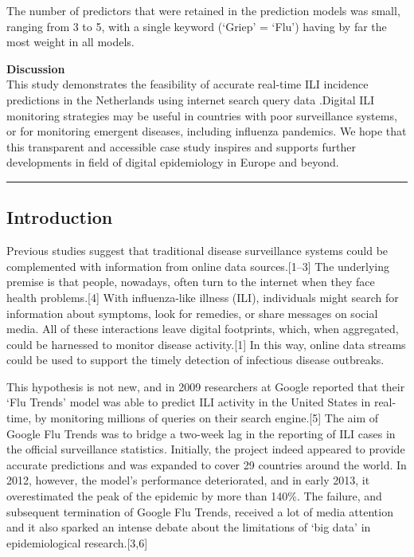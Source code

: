 \documentclass[]{article}
\begin{document}
The number of predictors that were retained in the prediction models was
small, ranging from 3 to 5, with a single keyword (`Griep' = `Flu')
having by far the most weight in all models.

\textbf{Discussion}\\
This study demonstrates the feasibility of accurate real-time ILI
incidence predictions in the Netherlands using internet search query
data .Digital ILI monitoring strategies may be useful in countries with
poor surveillance systems, or for monitoring emergent diseases,
including influenza pandemics. We hope that this transparent and
accessible case study inspires and supports further developments in
field of digital epidemiology in Europe and beyond.

\bigskip

\begin{center}\rule{0.5\linewidth}{\linethickness}\end{center}

\newpage

\hypertarget{introduction}{%
\subsection{\texorpdfstring{\textbf{Introduction}}{Introduction}}\label{introduction}}

Previous studies suggest that traditional disease surveillance systems
could be complemented with information from online data
sources.{[}1--3{]} The underlying premise is that people, nowadays,
often turn to the internet when they face health problems.{[}4{]} With
influenza-like illness (ILI), individuals might search for information
about symptoms, look for remedies, or share messages on social media.
All of these interactions leave digital footprints, which, when
aggregated, could be harnessed to monitor disease activity.{[}1{]} In
this way, online data streams could be used to support the timely
detection of infectious disease outbreaks.

This hypothesis is not new, and in 2009 researchers at Google reported
that their `Flu Trends' model was able to predict ILI activity in the
United States in real-time, by monitoring millions of queries on their
search engine.{[}5{]} The aim of Google Flu Trends was to bridge a
two-week lag in the reporting of ILI cases in the official surveillance
statistics. Initially, the project indeed appeared to provide accurate
predictions and was expanded to cover 29 countries around the world. In
2012, however, the model's performance deteriorated, and in early 2013,
it overestimated the peak of the epidemic by more than 140\%. The
failure, and subsequent termination of Google Flu Trends, received a lot
of media attention and it also sparked an intense debate about the
limitations of `big data' in epidemiological research.{[}3,6{]}
\end{document}

